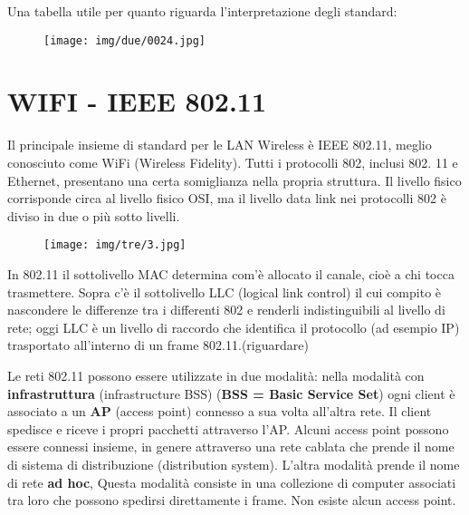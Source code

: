 \documentclass{article}
\begin{document}
\noindent Una tabella utile per quanto riguarda l'interpretazione degli standard:

\begin{figure}[!ht]
    \begin{center}
        \texttt{[image: img/due/0024.jpg]}         
    \end{center}
\end{figure}

\pagebreak

\section{WIFI - IEEE 802.11}
Il principale insieme di standard per le LAN Wireless è IEEE 802.11, meglio conosciuto come WiFi (Wireless Fidelity).
Tutti i protocolli 802, inclusi 802. 11 e Ethernet, presentano una certa somiglianza nella propria
struttura. Il livello fisico corrisponde circa al livello fisico OSI, ma il livello data link nei protocolli 802 è diviso in due
 o più sotto livelli.

\begin{figure}[!ht]
    \begin{center}
        \texttt{[image: img/tre/3.jpg]}         
    \end{center}
\end{figure}

\noindent In 802.11 il sottolivello MAC determina com'è allocato il canale, cioè a chi tocca
trasmettere. Sopra c'è il sottolivello LLC (logical link control) il cui compito è nascondere
le differenze tra i differenti 802 e renderli indistinguibili al livello di rete; oggi LLC è un
livello di raccordo che identifica il protocollo (ad esempio IP) trasportato all'interno di un
frame 802.11.(riguardare)
\medskip

Le reti 802.11 possono essere utilizzate in due modalità: nella modalità con \textbf{infrastruttura}
(infrastructure BSS) (\textbf{BSS = Basic Service Set}) ogni client è associato a un \textbf{AP} (access
point) connesso a sua volta all'altra rete. Il client spedisce e riceve i propri pacchetti
attraverso l'AP. Alcuni access point possono essere connessi insieme, in genere attraverso
una rete cablata che prende il nome di sistema di distribuzione (distribution system).
L'altra modalità prende il nome di rete \textbf{ad hoc}, Questa modalità consiste in una collezione
di computer associati tra loro che possono spedirsi direttamente i frame. Non esiste alcun
access point.
\end{document}
